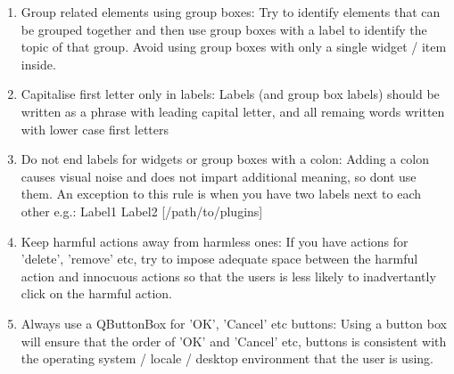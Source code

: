  \begin{enumerate}
 \item Group related elements using group boxes:
   Try to identify elements that can be grouped together and then use 
   group boxes with a label to identify the topic of that group. 
   Avoid using group boxes with only a single widget / item inside.
 \item Capitalise first letter only in labels:
   Labels (and group box labels) should be written as a phrase with leading capital letter,
   and all remaing words written with lower case first letters 
 \item Do not end labels for widgets or group boxes with a colon:
   Adding a colon causes visual noise and does not impart additional meaning,
   so dont use them. An exception to this rule is when you have two labels 
   next to each other e.g.: Label1  Label2 [/path/to/plugins]
 \item Keep harmful actions away from harmless ones:
   If you have actions for 'delete', 'remove' etc, try to impose adequate 
   space between the harmful action and innocuous actions so that the users 
   is less likely to inadvertantly click on the harmful action.
 \item Always use a QButtonBox for 'OK', 'Cancel' etc buttons:
   Using a button box will ensure that the order of 'OK' and 'Cancel' etc, 
   buttons is consistent with the operating system / locale / desktop 
   environment that the user is using.
 \end{enumerate}

